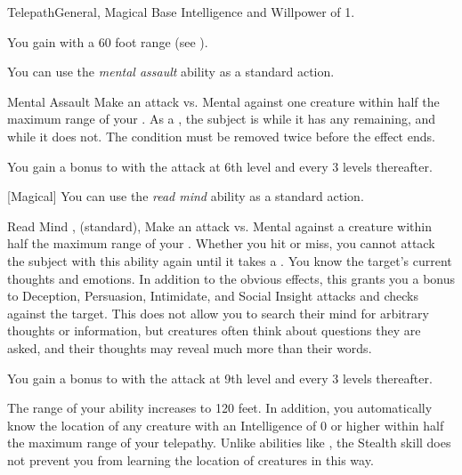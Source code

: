     \begin{feat}{Telepath}{General, Magical}
        \featpre Base Intelligence and Willpower of 1.

         You gain  with a 60 foot range (see ).

         You can use the \textit{mental assault} ability as a standard action.
        \begin{durationability}{Mental Assault}
            \rankline
            Make an attack vs. Mental against one creature within half the maximum range of your .
            \hit As a , the subject is \dazed while it has any  remaining, and \stunned while it does not.
            \crit The condition must be removed twice before the effect ends.

            \rankline
            You gain a  bonus to  with the attack at 6th level and every 3 levels thereafter.
        \end{durationability}

        [Magical] You can use the \textit{read mind} ability as a standard action.
        \begin{durationability}{Read Mind}
            ,  (standard), 
            \rankline
            Make an attack vs. Mental against a creature within half the maximum range of your .
            Whether you hit or miss, you cannot attack the subject with this ability again until it takes a .
            \hit You know the target's current thoughts and emotions.
            In addition to the obvious effects, this grants you a  bonus to Deception, Persuasion, Intimidate, and Social Insight attacks and checks against the target.
            This does not allow you to search their mind for arbitrary thoughts or information, but creatures often think about questions they are asked, and their thoughts may reveal much more than their words.

            \rankline
            You gain a  bonus to  with the attack at 9th level and every 3 levels thereafter.
        \end{durationability}

         The range of your  ability increases to 120 feet.
        In addition, you automatically know the location of any creature with an Intelligence of 0 or higher within half the maximum range of your telepathy.
        Unlike abilities like , the Stealth skill does not prevent you from learning the location of creatures in this way.


\end{feat}
